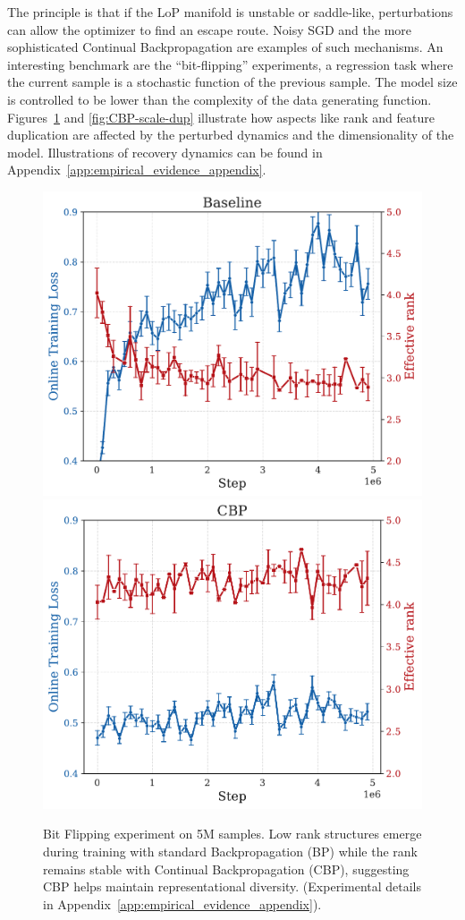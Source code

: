 \documentclass{article}
\numberwithin{figure}{section}
\begin{document}
The principle is that if the LoP manifold is unstable or saddle-like, perturbations can allow the optimizer to find an escape route. Noisy SGD and the more sophisticated Continual Backpropagation \citep{dohare2024loss} are examples of such mechanisms. An interesting benchmark are the ``bit-flipping'' experiments, a regression task where the current sample is a stochastic function of the previous sample. The model size is controlled to be lower than the complexity of the data generating function. Figures~\ref{fig:CBP-scale-rank} and \ref{fig:CBP-scale-dup} illustrate how aspects like rank and feature duplication are affected by the perturbed dynamics and the dimensionality of the model.   Illustrations of recovery dynamics can be found in Appendix~\ref{app:empirical_evidence_appendix}.
\begin{figure}[!ht]
    \centering
    \includegraphics[width=0.33\linewidth]{paper/images/bf_Baseline_rankloss_plot.pdf}
    \includegraphics[width=0.33\linewidth]{paper/images/bf_CBP_rankloss_plot.pdf}
        \vspace{-.3cm}
    \caption{Bit Flipping experiment on 5M samples. Low rank structures emerge during training with standard Backpropagation (BP) while the rank remains stable with Continual Backpropagation (CBP), suggesting CBP helps maintain representational diversity. (Experimental details in Appendix~\ref{app:empirical_evidence_appendix}).}
    \label{fig:CBP-scale-rank}
\end{figure}
\end{document}
